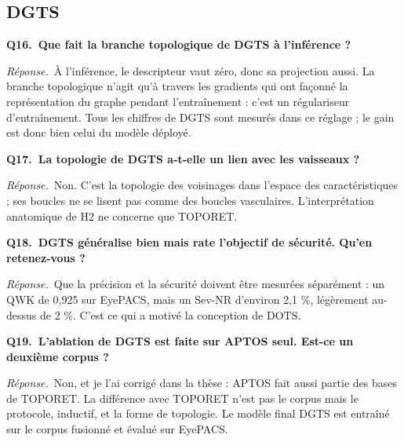 \documentclass[11pt,a4paper]{article}
\begin{document}
\subsection*{DGTS}
\textbf{Q16.~Que fait la branche topologique de DGTS à l'inférence ?}\par\nopagebreak
\textit{Réponse.}~À l'inférence, le descripteur vaut zéro, donc sa projection aussi. La branche topologique n'agit qu'à travers les gradients qui ont façonné la représentation du graphe pendant l'entraînement : c'est un régulariseur d'entraînement. Tous les chiffres de DGTS sont mesurés dans ce réglage ; le gain est donc bien celui du modèle déployé.\par\medskip
\textbf{Q17.~La topologie de DGTS a-t-elle un lien avec les vaisseaux ?}\par\nopagebreak
\textit{Réponse.}~Non. C'est la topologie des voisinages dans l'espace des caractéristiques ; ses boucles ne se lisent pas comme des boucles vasculaires. L'interprétation anatomique de H2 ne concerne que TOPORET.\par\medskip
\textbf{Q18.~DGTS généralise bien mais rate l'objectif de sécurité. Qu'en retenez-vous ?}\par\nopagebreak
\textit{Réponse.}~Que la précision et la sécurité doivent être mesurées séparément : un QWK de 0,925 sur EyePACS, mais un Sev-NR d'environ 2,1 \%, légèrement au-dessus de 2 \%. C'est ce qui a motivé la conception de DOTS.\par\medskip
\textbf{Q19.~L'ablation de DGTS est faite sur APTOS seul. Est-ce un deuxième corpus ?}\par\nopagebreak
\textit{Réponse.}~Non, et je l'ai corrigé dans la thèse : APTOS fait aussi partie des bases de TOPORET. La différence avec TOPORET n'est pas le corpus mais le protocole, inductif, et la forme de topologie. Le modèle final DGTS est entraîné sur le corpus fusionné et évalué sur EyePACS.\par\medskip
\end{document}
